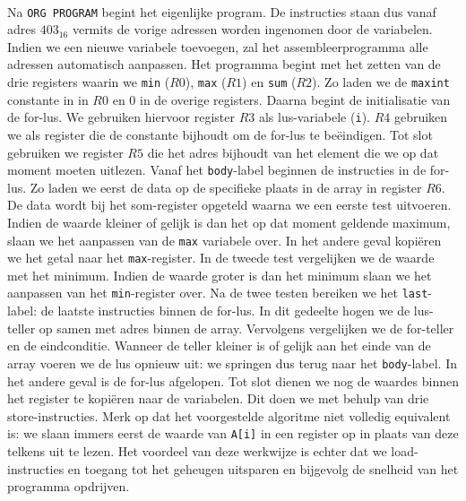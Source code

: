 \paragraph{}
Na \verb+ORG PROGRAM+ begint het eigenlijke program. De instructies staan dus vanaf adres $403_{16}$ vermits de vorige adressen worden ingenomen door de variabelen. Indien we een nieuwe variabele toevoegen, zal het assembleerprogramma alle adressen automatisch aanpassen. Het programma begint met het zetten van de drie registers waarin we \verb+min+ ($R0$), \verb+max+ ($R1$) en \verb+sum+ ($R2$). Zo laden we de \verb+maxint+ constante in in $R0$ en $0$ in de overige registers. Daarna begint de initialisatie van de for-lus. We gebruiken hiervoor register $R3$ als lus-variabele (\verb+i+). $R4$ gebruiken we als register die de constante bijhoudt om de for-lus te be\"eindigen. Tot slot gebruiken we register $R5$ die het adres bijhoudt van het element die we op dat moment moeten uitlezen. Vanaf het \verb+body+-label beginnen de instructies in de for-lus. Zo laden we eerst de data op de specifieke plaats in de array in register $R6$. De data wordt bij het som-register opgeteld waarna we een eerste test uitvoeren. Indien de waarde kleiner of gelijk is dan het op dat moment geldende maximum, slaan we het aanpassen van de \verb+max+ variabele over. In het andere geval kopi\"eren we het getal naar het \verb+max+-register. In de tweede test vergelijken we de waarde met het minimum. Indien de waarde groter is dan het minimum slaan we het aanpassen van het \verb+min+-register over. Na de twee testen bereiken we het \verb+last+-label: de laatste instructies binnen de for-lus. In dit gedeelte hogen we de lus-teller op samen met adres binnen de array. Vervolgens vergelijken we de for-teller en de eindconditie. Wanneer de teller kleiner is of gelijk aan het einde van de array voeren we de lus opnieuw uit: we springen dus terug naar het \verb+body+-label. In het andere geval is de for-lus afgelopen. Tot slot dienen we nog de waardes binnen het register te kopi\"eren naar de variabelen. Dit doen we met behulp van drie store-instructies. Merk op dat het voorgestelde algoritme niet volledig equivalent is: we slaan immers eerst de waarde van \verb+A[i]+ in een register op in plaats van deze telkens uit te lezen. Het voordeel van deze werkwijze is echter dat we load-instructies en toegang tot het geheugen uitsparen en bijgevolg de snelheid van het programma opdrijven.
